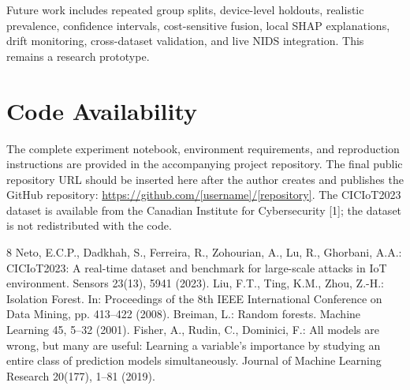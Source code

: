 \documentclass[runningheads]{llncs}
\begin{document}
Future work includes repeated group splits, device-level holdouts, realistic prevalence, confidence intervals, cost-sensitive fusion, local SHAP explanations, drift monitoring, cross-dataset validation, and live NIDS integration. This remains a research prototype.

\section*{Code Availability}
The complete experiment notebook, environment requirements, and reproduction instructions are provided in the accompanying project repository. The final public repository URL should be inserted here after the author creates and publishes the GitHub repository: \url{https://github.com/[username]/[repository]}. The CICIoT2023 dataset is available from the Canadian Institute for Cybersecurity [1]; the dataset is not redistributed with the code.

\begin{thebibliography}{8}
 Neto, E.C.P., Dadkhah, S., Ferreira, R., Zohourian, A., Lu, R., Ghorbani, A.A.: CICIoT2023: A real-time dataset and benchmark for large-scale attacks in IoT environment. Sensors 23(13), 5941 (2023). 
 Liu, F.T., Ting, K.M., Zhou, Z.-H.: Isolation Forest. In: Proceedings of the 8th IEEE International Conference on Data Mining, pp. 413--422 (2008). 
 Breiman, L.: Random forests. Machine Learning 45, 5--32 (2001). 
 Fisher, A., Rudin, C., Dominici, F.: All models are wrong, but many are useful: Learning a variable's importance by studying an entire class of prediction models simultaneously. Journal of Machine Learning Research 20(177), 1--81 (2019).
\end{thebibliography}
\end{document}
